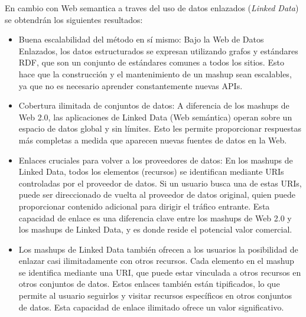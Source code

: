 En cambio con Web semantica a traves del uso de datos enlazados (\textit{Linked Data}) se obtendrán los siguientes resultados:
\begin{itemize}
  \item Buena escalabilidad del método en sí mismo: Bajo la Web de Datos Enlazados, los datos estructurados se expresan utilizando grafos y estándares RDF, que son un conjunto de estándares comunes a todos los sitios. Esto hace que la construcción y el mantenimiento de un mashup sean escalables, ya que no es necesario aprender constantemente nuevas APIs.
  \item Cobertura ilimitada de conjuntos de datos: A diferencia de los mashups de Web 2.0, las aplicaciones de Linked Data (Web semántica) operan sobre un espacio de datos global y sin límites. Esto les permite proporcionar respuestas más completas a medida que aparecen nuevas fuentes de datos en la Web.
  \item Enlaces cruciales para volver a los proveedores de datos: En los mashups de Linked Data, todos los elementos (recursos) se identifican mediante URIs controladas por el proveedor de datos. Si un usuario busca una de estas URIs, puede ser direccionado de vuelta al proveedor de datos original, quien puede proporcionar contenido adicional para dirigir el tráfico entrante. Esta capacidad de enlace es una diferencia clave entre los mashups de Web 2.0 y los mashups de Linked Data, y es donde reside el potencial valor comercial.
  \item Los mashups de Linked Data también ofrecen a los usuarios la posibilidad de enlazar casi ilimitadamente con otros recursos. Cada elemento en el mashup se identifica mediante una URI, que puede estar vinculada a otros recursos en otros conjuntos de datos. Estos enlaces también están tipificados, lo que permite al usuario seguirlos y visitar recursos específicos en otros conjuntos de datos. Esta capacidad de enlace ilimitado ofrece un valor significativo.
\end{itemize}

